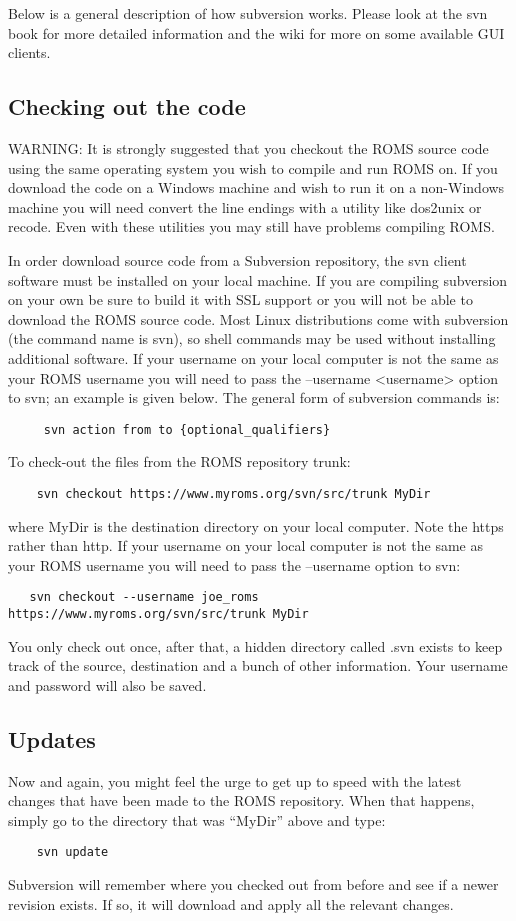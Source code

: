 Below is a general description of how subversion works. Please look
at the svn book \citep{SVN} for more detailed information and the wiki
for more on some available GUI clients.

\subsection{Checking out the code}
WARNING: It is strongly suggested that you checkout the ROMS source
code using the same operating system you wish to compile and run
ROMS on. If you download the code on a Windows machine and wish to
run it on a non-Windows machine you will need convert the line
endings with a utility like dos2unix or recode. Even with these
utilities you may still have problems compiling ROMS.

In order download source code from a Subversion repository, the svn
client software must be installed on your local machine. If you are
compiling subversion on your own be sure to build it with SSL
support or you will not be able to download the ROMS source code.
Most Linux distributions come with subversion (the command name is
svn), so shell commands may be used without installing additional
software. If your username on your local computer is not the same as
your ROMS username you will need to pass the --username <username>
option to svn; an example is given below. The general form of
subversion commands is: 
\begin{verbatim}
     svn action from to {optional_qualifiers} 
\end{verbatim}
To check-out the files from the ROMS repository trunk:
\begin{verbatim}
    svn checkout https://www.myroms.org/svn/src/trunk MyDir
\end{verbatim}
where MyDir is the destination directory on your local computer.
Note the https rather than http. If your username on your local
computer is not the same as your ROMS username you will need to pass
the --username option to svn:
\begin{verbatim}
   svn checkout --username joe_roms https://www.myroms.org/svn/src/trunk MyDir
\end{verbatim}
You only check out once, after that, a hidden directory called .svn
exists to keep track of the source, destination and a bunch of other
information. Your username and password will also be saved.

\subsection{Updates}
Now and again, you might feel the urge to get up to speed with the
latest changes that have been made to the ROMS repository. When that
happens, simply go to the directory that was ``MyDir'' above and
type:
\begin{verbatim}
    svn update
\end{verbatim}
Subversion will remember where you checked out from before and
see if a newer revision exists. If so, it will download and apply
all the relevant changes.

